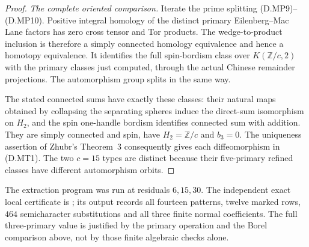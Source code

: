 \begin{proof}
\emph{The complete oriented comparison.}
Iterate the prime splitting (D.MP9)--(D.MP10).
Positive integral homology of the distinct primary
Eilenberg--Mac Lane factors has zero cross tensor and
Tor products. The wedge-to-product inclusion is therefore
a simply connected homology equivalence and hence a
homotopy equivalence. It identifies the full spin-bordism
class over $K(\mathbb Z/c,2)$ with the primary classes
just computed, through the actual Chinese remainder
projections. The automorphism group splits in the same way.

The stated connected sums have exactly these classes:
their natural maps obtained by collapsing the separating
spheres induce the direct-sum isomorphism on $H_2$, and
the spin one-handle bordism identifies connected sum
with addition. They are simply connected and spin, have
$H_2=\mathbb Z/c$ and $b_3=0$. The uniqueness assertion
of Zhubr's Theorem~3 \cite[p.795]{manZhubr75} consequently
gives each diffeomorphism in (D.MT1). The two $c=15$
types are distinct because their five-primary refined
classes have different automorphism orbits.
\end{proof}

The extraction program was run at residuals $6,15,30$.
The independent exact local certificate is
; its output records
all fourteen patterns, twelve marked rows, $464$
semicharacter substitutions and all three finite normal
coefficients. The full three-primary value is justified
by the primary operation and the Borel comparison above,
not by those finite algebraic checks alone.
